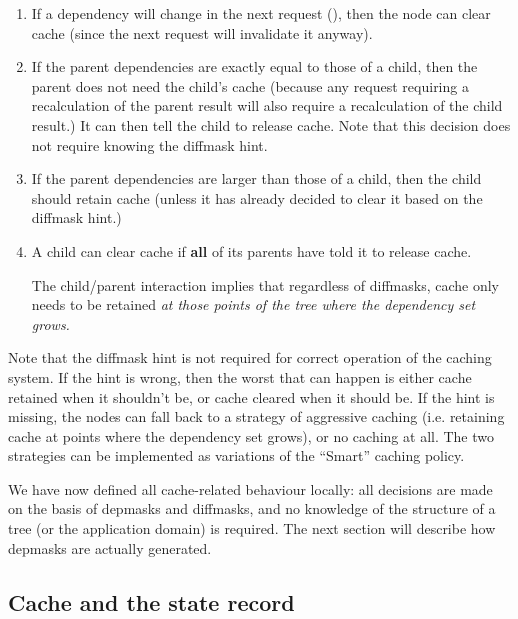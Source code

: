   \begin{enumerate}
  
  \item If a dependency will change in the next request (), then the node can clear cache (since the next request will
    invalidate it anyway).

  \item If the parent dependencies are exactly equal to those of a child, then
    the parent does not need the child's cache (because any request requiring a
    recalculation of the parent result will also require a recalculation of the
    child result.) It can then tell the child to release cache. Note that this
    decision does not require knowing the diffmask hint.

  \item If the parent dependencies are larger than those of a child, then the 
    child should retain cache (unless it has already decided to clear it
    based on the diffmask hint.) 

  \item A child can clear cache if {\bf all} of its parents have told it to
    release cache.
    
    The child/parent interaction implies that regardless of diffmasks, cache
    only needs to be retained {\em at those points of the tree where the
    dependency set grows.}

  \end{enumerate}
  
  Note that the diffmask hint is not required for correct operation of the
  caching system. If the hint is wrong, then the worst that can happen is
  either cache retained when it shouldn't be, or cache cleared when it should
  be. If the hint is missing, the nodes can fall back to a strategy of
  aggressive caching (i.e. retaining cache at points where the dependency set
  grows), or no caching at all. The two strategies can be implemented as
  variations of the ``Smart'' caching policy.

  We have now defined all cache-related behaviour locally: all decisions are
  made on the basis of depmasks and diffmasks, and no knowledge of the
  structure of a tree (or the application domain) is required. The next section
  will describe how depmasks are actually generated.

\subsection{Cache and the state record}

